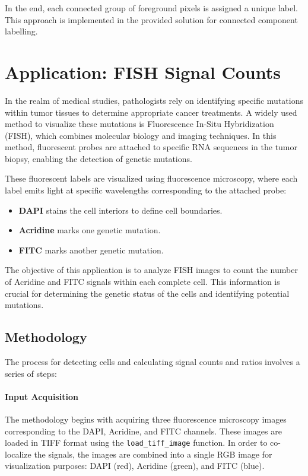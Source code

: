 \documentclass[a4paper,12pt]{article}
\begin{document}
In the end, each connected group of foreground pixels is assigned a unique label. This approach is implemented in the provided solution for connected component labelling.

\newpage

\section{Application: FISH Signal Counts}

In the realm of medical studies, pathologists rely on identifying specific mutations within tumor tissues to determine appropriate cancer treatments. A widely used method to visualize these mutations is Fluorescence In-Situ Hybridization (FISH), which combines molecular biology and imaging techniques. In this method, fluorescent probes are attached to specific RNA sequences in the tumor biopsy, enabling the detection of genetic mutations.

These fluorescent labels are visualized using fluorescence microscopy, where each label emits light at specific wavelengths corresponding to the attached probe:
\begin{itemize}
    \item \textbf{DAPI} stains the cell interiors to define cell boundaries.
    \item \textbf{Acridine} marks one genetic mutation.
    \item \textbf{FITC} marks another genetic mutation.
\end{itemize}

The objective of this application is to analyze FISH images to count the number of Acridine and FITC signals within each complete cell. This information is crucial for determining the genetic status of the cells and identifying potential mutations.

\subsection{Methodology}

The process for detecting cells and calculating signal counts and ratios involves a series of steps:

\paragraph{Input Acquisition}

The methodology begins with acquiring three fluorescence microscopy images corresponding to the DAPI, Acridine, and FITC channels. These images are loaded in TIFF format using the \texttt{load\_tiff\_image} function. In order to co-localize the signals, the images are combined into a single RGB image for visualization purposes: DAPI (red), Acridine (green), and FITC (blue).
\end{document}
